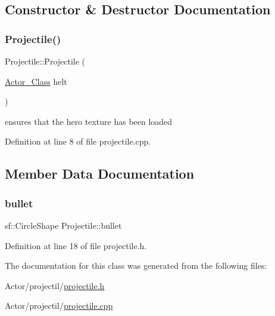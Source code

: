 \subsection{Constructor \& Destructor Documentation}
\hypertarget{class_projectile_a0ca8d850d6bdd8d18dcbc169fc143680}{}\label{class_projectile_a0ca8d850d6bdd8d18dcbc169fc143680} 
\subsubsection{\texorpdfstring{Projectile()}{Projectile()}}
{\footnotesize\ttfamily Projectile\+::\+Projectile (\begin{DoxyParamCaption}\item[{\hyperlink{class_actor___class}{Actor\+\_\+\+Class}}]{helt }\end{DoxyParamCaption})}

ensures that the hero texture has been loaded 

Definition at line 8 of file projectile.\+cpp.



\subsection{Member Data Documentation}
\hypertarget{class_projectile_a192f178538dd28037dcae72846693339}{}\label{class_projectile_a192f178538dd28037dcae72846693339} 
\subsubsection{\texorpdfstring{bullet}{bullet}}
{\footnotesize\ttfamily sf\+::\+Circle\+Shape Projectile\+::bullet}



Definition at line 18 of file projectile.\+h.



The documentation for this class was generated from the following files\+:\begin{DoxyCompactItemize}
\item 
Actor/projectil/\hyperlink{projectile_8h}{projectile.\+h}\item 
Actor/projectil/\hyperlink{projectile_8cpp}{projectile.\+cpp}\end{DoxyCompactItemize}
